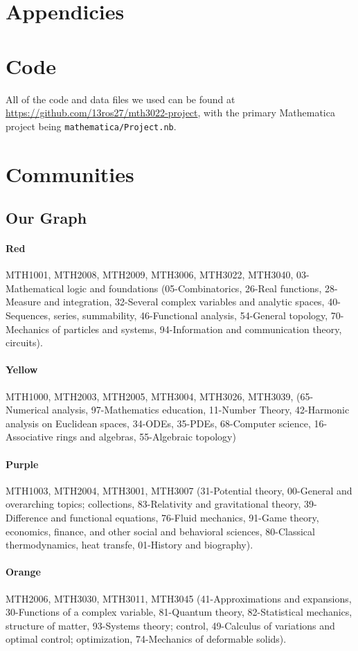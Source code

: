 \documentclass[english, 12pt]{article}
\begin{document}
\printbibliography
\section*{Appendicies}
\parskip=0.0pt
\appendix
\section{Code}
All of the code and data files we used can be found at \url{https://github.com/13ros27/mth3022-project}, with the primary Mathematica project being \texttt{mathematica/Project.nb}.

\section{Communities}\label{app:communities_comp}
\subsection{Our Graph} \label{app:our_graph_communities}
\paragraph{Red} MTH1001, MTH2008, MTH2009, MTH3006, MTH3022, MTH3040,  03-Mathematical logic and foundations (05-Combinatorics, 26-Real functions, 28- Measure and integration, 32-Several complex variables and analytic spaces, 40-Sequences, series, summability, 46-Functional analysis, 54-General topology, 70-Mechanics of particles and systems, 94-Information and communication theory, circuits).
\parskip=-16.0pt
\paragraph{Yellow} MTH1000, MTH2003, MTH2005, MTH3004, MTH3026, MTH3039, (65-Numerical analysis, 97-Mathematics education, 11-Number Theory, 42-Harmonic analysis on Euclidean spaces, 34-ODEs, 35-PDEs, 68-Computer science, 16-Associative rings and algebras, 55-Algebraic topology)
\paragraph{Purple} MTH1003, MTH2004, MTH3001, MTH3007 (31-Potential theory, 00-General and overarching topics; collections, 83-Relativity and gravitational theory, 39-Difference and functional equations, 76-Fluid mechanics, 91-Game theory, economics, finance, and other social and behavioral sciences, 80-Classical thermodynamics, heat transfe, 01-History and biography).
\paragraph{Orange} MTH2006, MTH3030, MTH3011, MTH3045 (41-Approximations and expansions, 30-Functions of a complex variable, 81-Quantum theory, 82-Statistical mechanics, structure of matter, 93-Systems theory; control, 49-Calculus of variations and optimal control; optimization, 74-Mechanics of deformable solids).
\end{document}
